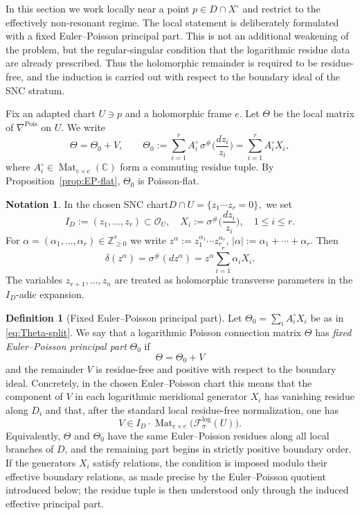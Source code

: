 \documentclass[11pt]{amsart}
\theoremstyle{plain}
\theoremstyle{definition}
\newtheorem{definition}[theorem]{Definition}
\newtheorem{notation}[theorem]{Notation}
\DeclareMathOperator{\Mat}{Mat}
\newcommand{\fol}{\mathcal{F}}
\newcommand{\ZZ}{\mathbb Z}
\theoremstyle{definition}
\newcommand{\C}{\mathbb{C}}
\newcommand{\OO}{\mathcal{O}}
\begin{document}
In this section we work locally near a point $p\in D\cap X^\circ$ and restrict to the effectively non-resonant regime.  The local statement is deliberately formulated with a fixed Euler--Poisson principal part.  This is not an additional weakening of the problem, but the regular-singular condition that the logarithmic residue data are already prescribed.  Thus the holomorphic remainder is required to be residue-free, and the induction is carried out with respect to the boundary ideal of the SNC stratum.

Fix an adapted chart $U\ni p$ and a holomorphic frame $e$.  Let $\Theta$ be the local matrix of $\nabla^{\mathrm{Pois}}$ on $U$.  We write
\begin{equation}\label{eq:Theta-split}
\Theta=\Theta_0+V,
\qquad
\Theta_0:=\sum_{i=1}^r A_i^\circ\,\sigma^\#\Big(\frac{dz_i}{z_i}\Big)=\sum_{i=1}^r A_i^\circ X_i,
\end{equation}
where $A_i^\circ\in\Mat_{e\times e}(\C)$ form a commuting residue tuple.  By Proposition~\ref{prop:EP-flat}, $\Theta_0$ is Poisson-flat.

\begin{notation} \label{not:boundary-ideal}
In the chosen SNC chart$
D\cap U=\{z_1\cdots z_r=0\},
$
we set
\[
I_D:=(z_1,\ldots,z_r)\subset\OO_U,
\quad
X_i:=\sigma^\#\Big(\frac{dz_i}{z_i}\Big),\quad 1\le i\le r.
\]
For $\alpha=(\alpha_1,\ldots,\alpha_r)\in\ZZ_{\ge0}^r$ we write
$
z^\alpha:=z_1^{\alpha_1}\cdots z_r^{\alpha_r}$, $
  |\alpha|:=\alpha_1+\cdots+\alpha_r.$
Then
\begin{equation}\label{eq:delta-monomial}
\delta(z^\alpha)=\sigma^\#(d z^\alpha)
=z^\alpha\sum_{i=1}^r \alpha_i X_i.
\end{equation}
The variables $z_{r+1},\ldots,z_n$ are treated as holomorphic transverse parameters in the $I_D$-adic expansion.
\end{notation}

\begin{definition}[Fixed Euler--Poisson principal part]\label{def:fixed-EP-principal-part}
Let $\Theta_0=\sum_i A_i^\circ X_i$ be as in \eqref{eq:Theta-split}.  We say that a logarithmic Poisson connection matrix $\Theta$ has \emph{fixed Euler--Poisson principal part} $\Theta_0$ if
\[
\Theta=\Theta_0+V
\]
and the remainder $V$ is residue-free and positive with respect to the boundary ideal.  Concretely, in the chosen Euler--Poisson chart this means that the component of $V$ in each logarithmic meridional generator $X_i$ has vanishing residue along $D_i$ and that, after the standard local residue-free normalization, one has
\begin{equation}\label{eq:residue-free-positive}
V\in I_D\cdot \Mat_{e\times e}\big(\fol_\sigma^{\log}(U)\big).
\end{equation}
Equivalently, $\Theta$ and $\Theta_0$ have the same Euler--Poisson residues along all local branches of $D$, and the remaining part begins in strictly positive boundary order.  If the generators $X_i$ satisfy relations, the condition is imposed modulo their effective boundary relations, as made precise by the Euler--Poisson quotient introduced below; the residue tuple is then understood only through the induced effective principal part.
\end{definition}
\end{document}
